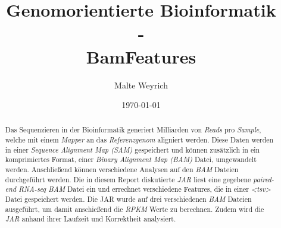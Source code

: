 \documentclass[12pt]{article}
\title{Genomorientierte Bioinformatik \\ - \\ BamFeatures}
\author{Malte Weyrich}
\date{\today}
\begin{document}
\maketitle
\begin{abstract}
Das Sequenzieren in der Bioinformatik generiert Milliarden von \textit{Reads} pro \textit{Sample}, welche mit
einem \textit{Mapper} an das \textit{Referenzgenom} aligniert werden. 
Diese Daten werden in einer \textit{Sequence Alignment Map (SAM)} gespeichert und können zusätzlich in ein komprimiertes Format,
einer \textit{Binary Alignment Map (BAM)} Datei, umgewandelt werden. Anschließend können verschiedene Analysen auf
den \textit{BAM} Dateien durchgeführt werden. Die in diesem Report diskutierte \textit{JAR} liest eine gegebene
\textit{paired-end RNA-seq BAM} Datei ein und errechnet verschiedene Features, die in einer \textit{<tsv>} Datei
gespeichert werden. Die JAR wurde auf drei verschiedenen \textit{BAM} Dateien ausgeführt, um damit
anschießend die \textit{RPKM} Werte zu berechnen. Zudem wird die \textit{JAR} anhand ihrer Laufzeit und
Korrektheit analysiert.

\end{abstract}

\newpage



\end{document}
